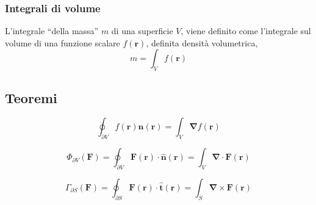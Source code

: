 \subsubsection{Integrali di volume}
\begin{definition}[Massa] L'integrale ``della massa'' $m$ di una superficie $V$, viene definito come l'integrale sul volume di una funzione scalare $f(\mathbf{r})$, definita densità volumetrica,
    \begin{equation}
        m = \int_{V} f(\mathbf{r})
    \end{equation}
\end{definition}


\subsection{Teoremi}
\begin{theorem}
    \begin{equation}
        \oint_{\partial V} f(\mathbf{r}) \mathbf{\hat{n}}(\mathbf{r}) = \int_V \mathbf{\nabla} f(\mathbf{r})
    \end{equation}
\end{theorem}

\begin{theorem}
    \begin{equation}
        \Phi_{\partial V}(\mathbf{F}) = \oint_{\partial V} \mathbf{F}(\mathbf{r}) \cdot \mathbf{\hat{n}}(\mathbf{r}) = \int_V \mathbf{\nabla} \cdot \mathbf{F}(\mathbf{r})
    \end{equation}
\end{theorem}

\begin{theorem}
    \begin{equation}
        \Gamma_{\partial S}(\mathbf{F}) = \oint_{\partial S} \mathbf{F}(\mathbf{r}) \cdot \mathbf{\hat{t}}(\mathbf{r}) = \int_S \mathbf{\nabla} \times \mathbf{F}(\mathbf{r})
    \end{equation}
\end{theorem}

